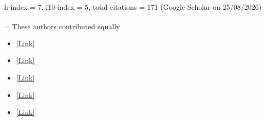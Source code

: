 \documentclass[11pt,a4paper,ragged2e,academicons]{altacv}
\begin{document}
\begin{fullwidth}


{}
\footnotesize h-index = 7, i10-index = 5, total citations = 171 (Google Scholar on 25/08/2026)
\begin{flushright}
\vspace{-1.5em} 
\footnotesize \textsuperscript{\textdagger} = These authors contributed equally %
\end{flushright}
\normalsize
{}

\begin{itemize}
\item {} \href{doi.org/10.1038/s41467-026-75703-4}{[Link]}
\item {} \href{https://www.frontiersin.org/journals/neuroscience/articles/10.3389/fnins.2023.1190515/full}{[Link]}
\item {} \href{https://compneuro.uwaterloo.ca/files/publications/dumont2023brainsci.pdf}{[Link]}
\item {} \href{https://compneuro.uwaterloo.ca/files/publications/voelker.2021a.pdf}{[Link]}
\item {} \href{https://link.springer.com/article/10.1007/s10614-021-10179-6}{[Link]}
\end{itemize}

% 
\divider



\end{fullwidth}
\end{document}
